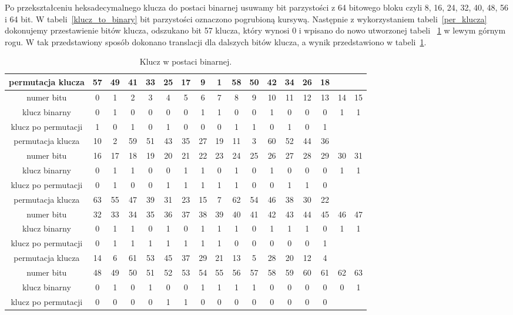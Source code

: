 \documentclass[12p]{article}
\begin{document}
Po przekształceniu heksadecymalnego klucza do postaci binarnej usuwamy bit parzystości z 64 bitowego bloku czyli 8, 16, 24, 32, 40, 48, 56 i 64 bit. W tabeli~\ref{klucz_to_binary} bit parzystości oznaczono pogrubioną kursywą. Następnie z wykorzystaniem tabeli~\ref{per_klucza} dokonujemy przestawienie bitów klucza, odszukano bit 57 klucza, który wynosi 0 i wpisano do nowo utworzonej tabeli ~\ref{tabela_podstawienia} w lewym górnym rogu. W tak przedstawiony sposób dokonano translacji dla dalszych bitów klucza, a wynik przedstawiono w tabeli~\ref{tabela_podstawienia}.

\begin{table}[H]
\centering
\begin{tabular}{|c|c|c|c|c|c|c|c|c|c|c|c|c|c|c|c|c|}
\hline
permutacja klucza & 57 & 49 & 41 & 33 & 25 & 17 & 9 & 1 & 58 & 50 & 42 & 34 & 26 & 18 & &\\
\hline
numer bitu & 0 & 1 & 2 & 3 & 4 & 5 & 6 & 7 & 8 & 9 & 10 & 11 & 12 & 13 & 14 & 15\\
\hline
klucz binarny & 0 & 1 & 0 & 0 & 0 & 0 & 1 & 1 & 0 & 0 & 1 & 0 & 0 & 0 & 1 & 1\\
\hline
klucz po permutacji & 1 & 0 & 1 & 0 & 1 & 0 & 0 & 0 & 1 & 1 & 0 & 1 & 0 & 1 &&\\

\hline
\hline
permutacja klucza & 10 & 2 & 59 & 51 & 43 & 35 & 27 & 19 & 11 & 3 & 60 & 52 & 44 & 36 &&\\
\hline
numer bitu & 16 & 17 & 18 & 19 & 20 & 21 & 22 & 23 & 24 & 25 & 26 & 27 & 28 & 29 & 30 & 31\\
\hline
klucz binarny & 0 & 1 & 1 & 0 & 0 & 1 & 1 & 0 & 1 & 0 & 1 & 0 & 0 & 0 & 1 & 1\\
\hline 
klucz po permutacji & 0 & 1 & 0 & 0 & 1 & 1 & 1 & 1 & 1 & 0 & 0 & 1 & 1 & 0 &&\\

\hline
\hline
permutacja klucza & 63 & 55 & 47 & 39 & 31 & 23 & 15 & 7 & 62 & 54 & 46 & 38 & 30 & 22 &&\\
\hline
numer bitu & 32 & 33 & 34 & 35 & 36 & 37 & 38 & 39 & 40 & 41 & 42 & 43 & 44 & 45 & 46 & 47 \\
\hline
klucz binarny & 0 & 1 & 1 & 0 & 1 & 0 & 1 & 1 & 1 & 0 & 1 & 1 & 1 & 0 & 1 & 1 \\
\hline
klucz po permutacji & 0 & 1 & 1 & 1 & 1 & 1 & 1 & 1 & 0 & 0 & 0 & 0 & 0 & 1 &&\\

\hline
\hline
permutacja klucza & 14 & 6 & 61 & 53 & 45 & 37 & 29 & 21 & 13 & 5 & 28 & 20 & 12 & 4 &&\\
\hline
numer bitu & 48 & 49 & 50 & 51 & 52 & 53 & 54 & 55 & 56 & 57 & 58 & 59 & 60 & 61 & 62 & 63\\
\hline
klucz binarny & 0 & 1 & 0 & 1 & 0 & 0 & 1 & 1 & 1 & 1 & 0 & 0 & 0 & 0 & 0 & 1\\
\hline 
klucz po permutacji & 0 & 0 & 0 & 0 & 1 & 1 & 0 & 0 & 0 & 0 & 0 & 0 & 0 & 0 &&\\
\hline
\end{tabular}
\caption{Klucz w postaci binarnej.}~\label{tabela_podstawienia}
\end{table}
\end{document}
